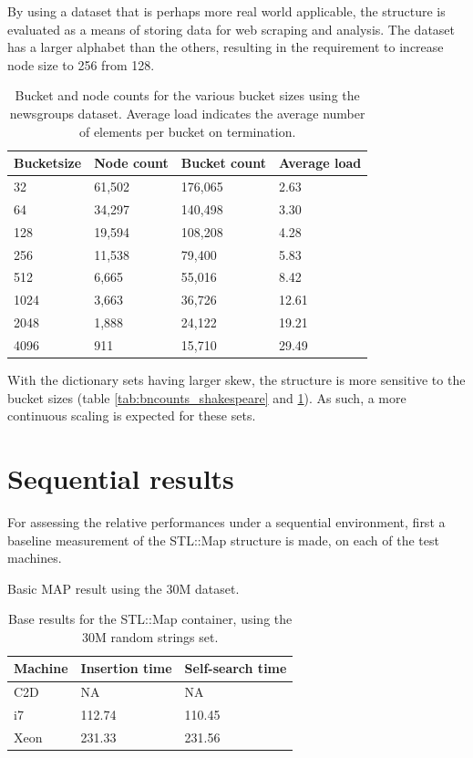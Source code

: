 By using a dataset that is perhaps more real world applicable, the structure is
evaluated as a means of storing data for web scraping and analysis. The dataset has a 
larger alphabet than the others, resulting in the requirement to increase
node size to 256 from 128.

\begin{table}[h]
    \centering
    \begin{tabular}[here]{ l l l l }
        \hline
        Bucketsize& Node count  & Bucket count & Average load  \\\hline
        32        &  61,502     & 176,065      & 2.63\\
        64        &  34,297     & 140,498      & 3.30\\
        128       &  19,594     & 108,208      & 4.28\\
        256       &  11,538     & 79,400       & 5.83\\
        512       &  6,665      & 55,016       & 8.42\\
        1024      &  3,663      & 36,726       & 12.61\\ 
        2048      &  1,888      & 24,122       & 19.21\\ 
        4096      &  911        & 15,710       & 29.49\\\hline 
    \end{tabular}
    \caption{Bucket and node counts for the various bucket sizes using the
    newsgroups dataset. Average load indicates the average number of elements
    per bucket on termination.}
    \label{tab:bncounts_ngrp}
\end{table}

With the dictionary sets having larger skew, the structure is more sensitive to
the bucket sizes (table \ref{tab:bncounts_shakespeare} and
\ref{tab:bncounts_ngrp}). As such, a more continuous scaling is expected for
these sets.

\section{Sequential results}
For assessing the relative performances under a sequential environment, first a
baseline measurement of the {\keyword STL::Map} structure is made, on each of
the test machines.

Basic MAP result using the 30M dataset.
\begin{table}[h!]
    \centering
    \begin{tabular}[here]{ l l l }
        \hline
        Machine   & Insertion time & Self-search time  \\\hline
        C2D       & NA             & NA                \\\hline
        i7        & 112.74         & 110.45            \\\hline
        Xeon      & 231.33         & 231.56            \\\hline 
    \end{tabular}
    \caption{Base results for the STL::Map container, using the 30M random strings set.}
    \label{tab:maptimes}
\end{table}

